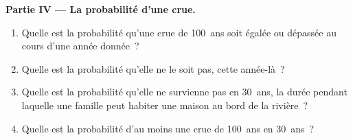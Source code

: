 \begin{problem}
\medskip
\noindent\textbf{Partie IV --- La probabilité d'une crue.}
\begin{enumerate}[resume]
  \item Quelle est la probabilité qu'une crue de \num{100}~ans soit égalée
        ou dépassée au cours d'une année donnée~?
  \item Quelle est la probabilité qu'elle ne le soit pas, cette année-là~?
  \item Quelle est la probabilité qu'elle ne survienne pas en \num{30}~ans,
        la durée pendant laquelle une famille peut habiter une maison au
        bord de la rivière~?
  \item Quelle est la probabilité d'au moins une crue de \num{100}~ans en
        \num{30}~ans~?
\end{enumerate}
\end{problem}
